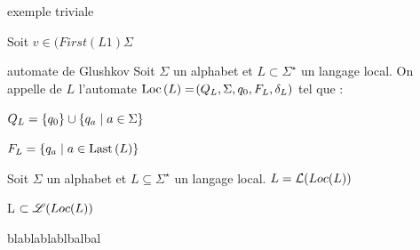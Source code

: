     \begin{example}
            exemple triviale 
            
            
            
            Soit $v \in (First(L1)\Sigma $ %
            
            
    \end{example}
    
    \begin{definition}{automate de Glushkov}{}
        Soit $\Sigma$ un alphabet et $L \subset \Sigma^\star$ un langage local. On appelle  de $L$ l'automate $\Loc{L} = \p{Q_L, \Sigma, q_0, F_L, \delta_L}$ tel que :
        \begin{enumerate}
            \itast $Q_L = \left\{q_0\right\} \cup \left\{q_a \;\middle\vert\; a \in \Sigma\right\}$
            
            \itast $F_L = \ens{q_a \enstq a \in \Last{L}} $
        \end{enumerate}
        
        
    \end{definition}
    
    \begin{theorem}
        Soit $\Sigma$ un alphabet et $L \subseteq \Sigma^\star$ un langage local. $L = \mathcal{L}(Loc(L))$
    \end{theorem}
    \begin{nproof}
        L $\subset \mathscr{L}(Loc(L))$
        \begin{enumerate}
            \itt \Huge{blablablablbalbal}
        \end{enumerate}
    \end{nproof}
        
        
    
    
    